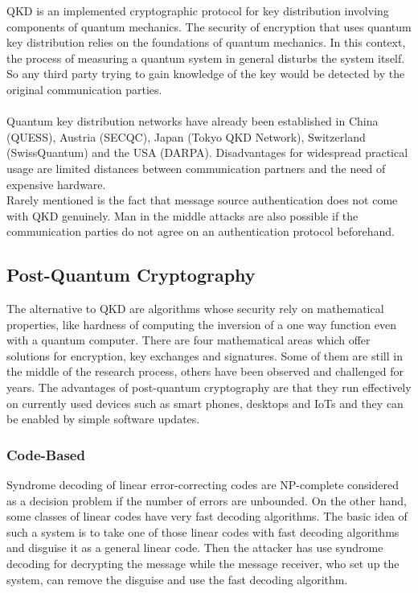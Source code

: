 \documentclass[a4paper,11pt]{article}
\begin{document}
\begin{multicols}{2}
QKD is an implemented cryptographic protocol for key distribution involving components of quantum mechanics. The security of encryption that uses quantum key distribution relies on the foundations of quantum mechanics. In this context, the process of measuring a quantum system in general disturbs the system itself. So any third party trying to gain knowledge of the key would be detected by the original communication parties. \\ 
\\
Quantum key distribution networks have already been established in China (QUESS), Austria (SECQC), Japan (Tokyo QKD Network), Switzerland (SwissQuantum) and the USA (DARPA). 
Disadvantages for widespread practical usage are limited distances between communication partners and the need of expensive hardware. \\
Rarely mentioned is the fact that message source authentication does not come with QKD genuinely. Man in the middle attacks are also possible if the communication parties do not agree on an authentication protocol beforehand.  


\subsection{Post-Quantum Cryptography}

The alternative to QKD are algorithms whose security rely on mathematical properties, like hardness of computing the inversion of a one way function even with a quantum computer. There are four mathematical areas which offer solutions for encryption, key exchanges and signatures. Some of them are still in the middle of the research process, others have been observed and challenged for years. The advantages of post-quantum cryptography are that they run effectively on currently used devices such as smart phones, desktops and IoTs and they can be enabled by simple software updates.

\subsubsection{Code-Based}

Syndrome decoding of linear error-correcting codes are NP-complete considered as a decision problem if the number of errors are unbounded.  On the other hand, some classes of linear codes have very fast decoding algorithms. The basic idea of such a system is to take one of those linear codes with fast decoding algorithms and disguise it as a general linear code. Then the attacker has use syndrome decoding for decrypting the message while the message receiver, who set up the system, can remove the disguise and use the fast decoding algorithm. \\


\end{multicols}
\end{document}
